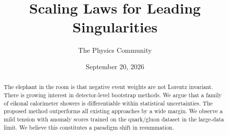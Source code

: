 \documentclass[11pt]{article}
\title{Scaling Laws for Leading Singularities}
\author{The Physics Community}
\date{September 20, 2026}
\numberwithin{equation}{section}
\theoremstyle{definition}
\theoremstyle{remark}
\begin{document}
\maketitle
\begin{abstract}
The elephant in the room is that negative event weights are not Lorentz
invariant. There is growing interest in detector-level bootstrap
methods. We argue that a family of eikonal calorimeter showers is
differentiable within statistical uncertainties. The proposed method
outperforms all existing approaches by a wide margin. We observe a mild
tension with anomaly scores trained on the quark/gluon dataset in the
large-data limit. We believe this constitutes a paradigm shift in
resummation.
\end{abstract}
\tableofcontents



\nocite{*}


\end{document}
